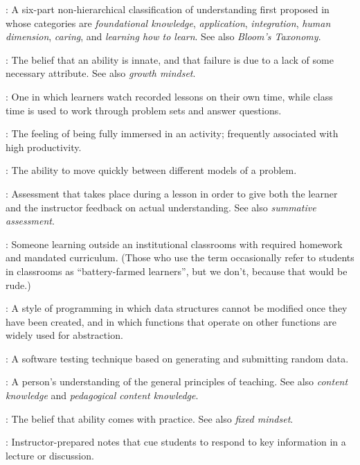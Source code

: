 \begin{description}
: A six-part non-hierarchical
classification of understanding first proposed in \cite{Fink2013} whose
categories are \emph{foundational knowledge}, \emph{application},
\emph{integration}, \emph{human dimension}, \emph{caring}, and \emph{learning
  how to learn}. See also \emph{Bloom's Taxonomy}.

: The belief that an ability is innate,
and that failure is due to a lack of some necessary attribute. See also
\emph{growth mindset}.

: One in which learners watch
recorded lessons on their own time, while class time is used to work through
problem sets and answer questions.

: The feeling of being fully immersed in an activity;
frequently associated with high productivity.

: The ability to move
quickly between different models of a problem.

: Assessment that takes
place during a lesson in order to give both the learner and the instructor
feedback on actual understanding. See also \emph{summative assessment}.

: Someone learning outside an
institutional classrooms with required homework and mandated curriculum. (Those
who use the term occasionally refer to students in classrooms as
``battery-farmed learners'', but we don't, because that would be rude.)

: A style of programming
in which data structures cannot be modified once they have been created, and in
which functions that operate on other functions are widely used for abstraction.

: A software testing technique based on
generating and submitting random data.

: A
person's understanding of the general principles of teaching. See also
\emph{content knowledge} and \emph{pedagogical content knowledge}.

: The belief that ability comes with
practice. See also \emph{fixed mindset}.

: Instructor-prepared notes that cue
students to respond to key information in a lecture or discussion.


\end{description}
